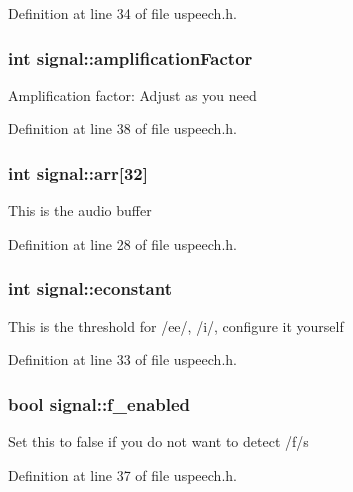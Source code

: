 Definition at line 34 of file uspeech.\-h.

\hypertarget{classsignal_a16d895fcf95efa3327fd7342f7bde145}{
\subsubsection[{amplification\-Factor}]{\setlength{\rightskip}{0pt plus 5cm}int signal\-::amplification\-Factor}}\label{classsignal_a16d895fcf95efa3327fd7342f7bde145}
Amplification factor\-: Adjust as you need 

Definition at line 38 of file uspeech.\-h.

\hypertarget{classsignal_a3e2d5027e6570321f8d1a823b0d47af0}{
\subsubsection[{arr}]{\setlength{\rightskip}{0pt plus 5cm}int signal\-::arr\mbox{[}32\mbox{]}}}\label{classsignal_a3e2d5027e6570321f8d1a823b0d47af0}
This is the audio buffer 

Definition at line 28 of file uspeech.\-h.

\hypertarget{classsignal_aa346a5acfecf429893ab85bc4a903875}{
\subsubsection[{econstant}]{\setlength{\rightskip}{0pt plus 5cm}int signal\-::econstant}}\label{classsignal_aa346a5acfecf429893ab85bc4a903875}
This is the threshold for /ee/, /i/, configure it yourself 

Definition at line 33 of file uspeech.\-h.

\hypertarget{classsignal_aaecf78836054e8f13a6caaf340d0b3c9}{
\subsubsection[{f\-\_\-enabled}]{\setlength{\rightskip}{0pt plus 5cm}bool signal\-::f\-\_\-enabled}}\label{classsignal_aaecf78836054e8f13a6caaf340d0b3c9}
Set this to false if you do not want to detect /f/s 

Definition at line 37 of file uspeech.\-h.

